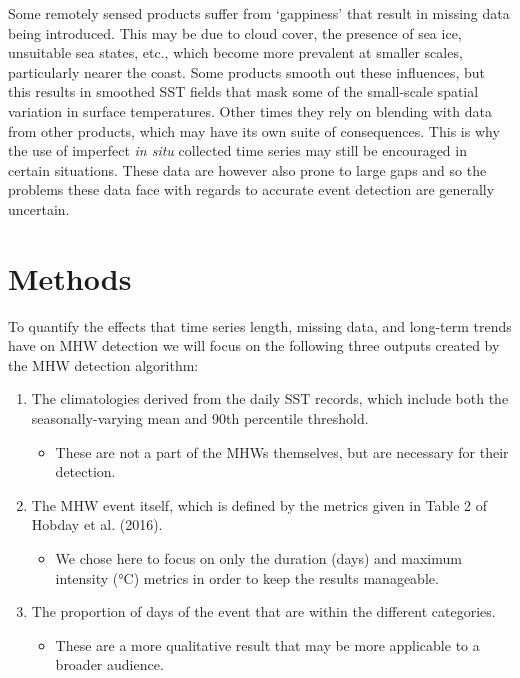 \documentclass[utf8]{frontiersSCNS} %
\begin{document}
Some remotely sensed products suffer from `gappiness' that result in
missing data being introduced. This may be due to cloud cover, the
presence of sea ice, unsuitable sea states, etc., which become more
prevalent at smaller scales, particularly nearer the coast. Some
products smooth out these influences, but this results in smoothed SST
fields that mask some of the small-scale spatial variation in surface
temperatures. Other times they rely on blending with data from other
products, which may have its own suite of consequences. This is why the
use of imperfect \emph{in situ} collected time series may still be
encouraged in certain situations. These data are however also prone to
large gaps and so the problems these data face with regards to accurate
event detection are generally uncertain.

\hypertarget{methods}{%
\section{Methods}\label{methods}}

To quantify the effects that time series length, missing data, and
long-term trends have on MHW detection we will focus on the following
three outputs created by the MHW detection algorithm:

\begin{enumerate}
\def\labelenumi{\arabic{enumi})}
\tightlist
\item
  The climatologies derived from the daily SST records, which include
  both the seasonally-varying mean and 90th percentile threshold.

  \begin{itemize}
  \tightlist
  \item
    These are not a part of the MHWs themselves, but are necessary for
    their detection.
  \end{itemize}
\item
  The MHW event itself, which is defined by the metrics given in Table 2
  of Hobday et al. (2016).

  \begin{itemize}
  \tightlist
  \item
    We chose here to focus on only the duration (days) and maximum
    intensity (°C) metrics in order to keep the results manageable.
  \end{itemize}
\item
  The proportion of days of the event that are within the different
  categories.

  \begin{itemize}
  \tightlist
  \item
    These are a more qualitative result that may be more applicable to a
    broader audience.
  \end{itemize}
\end{enumerate}
\end{document}
